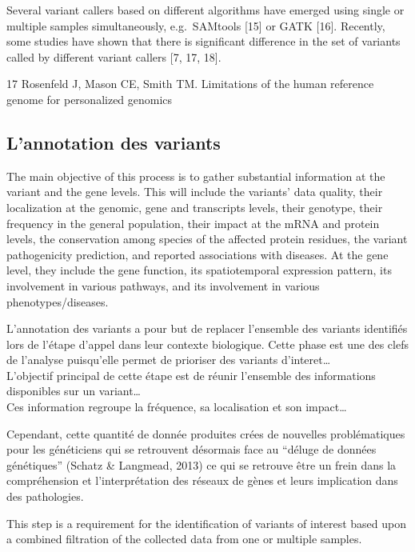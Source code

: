 \documentclass[12pt,twoside]{reedthesis}
\theoremstyle{definition}
\theoremstyle{definition}
\theoremstyle{remark}
\begin{document}
  Several variant callers based on different algorithms have emerged using
  single or multiple samples simultaneously, e.g.~SAMtools {[}15{]} or
  GATK {[}16{]}. Recently, some studies have shown that there is
  significant difference in the set of variants called by different
  variant callers {[}7, 17, 18{]}.
  
  17 Rosenfeld J, Mason CE, Smith TM. Limitations of the human reference
  genome for personalized genomics
  
  \subsection{L'annotation des variants}\label{lannotation-des-variants}
  
  The main objective of this process is to gather substantial information
  at the variant and the gene levels. This will include the variants' data
  quality, their localization at the genomic, gene and transcripts levels,
  their genotype, their frequency in the general population, their impact
  at the mRNA and protein levels, the conservation among species of the
  affected protein residues, the variant pathogenicity prediction, and
  reported associations with diseases. At the gene level, they include the
  gene function, its spatiotemporal expression pattern, its involvement in
  various pathways, and its involvement in various phenotypes/diseases.
  
  L'annotation des variants a pour but de replacer l'ensemble des variants
  identifiés lors de l'étape d'appel dans leur contexte biologique. Cette
  phase est une des clefs de l'analyse puisqu'elle permet de prioriser des
  variants d'interet\ldots{}\\
  L'objectif principal de cette étape est de réunir l'ensemble des
  informations disponibles sur un variant\ldots{}\\
  Ces information regroupe la fréquence, sa localisation et son
  impact\ldots{}
  
  Cependant, cette quantité de donnée produites crées de nouvelles
  problématiques pour les généticiens qui se retrouvent désormais face au
  ``déluge de données génétiques'' (Schatz \& Langmead, 2013) ce qui se
  retrouve être un frein dans la compréhension et l'interprétation des
  réseaux de gènes et leurs implication dans des pathologies.
  
  This step is a requirement for the identification of variants of
  interest based upon a combined filtration of the collected data from one
  or multiple samples.
  
\end{document}
